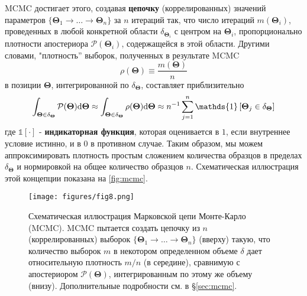 \documentclass[12pt, titlepage]{article}
\newcommand{\deriv}{\ensuremath{{\rm d}}}  %
\newcommand{\indicator}[1]{\ensuremath{\mathds{1}\left[{#1}\right]}}
\newcommand{\params}{\ensuremath{\boldsymbol\Theta}}
\newcommand{\posterior}{\ensuremath{\mathcal{P}}}
\begin{document}
MCMC достигает этого, создавая \textbf{цепочку} (коррелированных) значений параметров $\{ \params_1 \rightarrow \dots \rightarrow \params_n \}$ за $n$ итераций так, что число итераций $m(\params_i)$, проведенных в любой конкретной области $\delta_{\params_i}$ с центром на $\params_i$, пропорционально плотности апостериора $\posterior(\params_i)$, содержащейся в этой области. Другими словами, "плотность'' выборок, полученных в результате MCMC
\begin{equation}
    \rho(\params) \equiv \frac{m(\params)}{n}
\end{equation}
в позиции $\params$, интегрированной по $\delta_{\params}$, составляет приблизительно
\begin{equation}
    \int_{\params \in \delta_{\params}} \posterior(\params) \deriv \params
    \approx \int_{\params \in \delta_{\params}} \rho(\params) \deriv \params 
    \approx n^{-1} \sum_{j=1}^{n} \indicator{\params_j \in \delta_{\params}}
\end{equation}
где $\indicator{\cdot}$ - \textbf{индикаторная функция}, которая оценивается в $1$, если внутреннее условие истинно, и в $0$ в противном случае. Таким образом, мы можем аппроксимировать плотность простым сложением количества образцов в пределах $\delta_{\params}$ и нормировкой на общее количество образцов $n$. Схематическая иллюстрация этой концепции показана на {\color{red} \autoref{fig:mcmc}}.

\begin{figure}
\begin{center}
\texttt{[image: figures/fig8.png]}
\end{center}
\caption{Схематическая иллюстрация Марковской цепи Монте-Карло (MCMC). MCMC пытается создать цепочку из $n$ (коррелированных) выборок $\{ \params_1 \rightarrow \dots \rightarrow \params_n \}$ (вверху) такую, что количество выборок $m$ в некотором определенном объеме $\delta$ дает относительную плотность $m/n$ (в середине), сравнимую с апостериором $\posterior(\params)$, интегрированным по этому же объему (внизу). Дополнительные подробности см. в \S\ref{sec:mcmc}. }\label{fig:mcmc} \end{figure}
\end{document}
